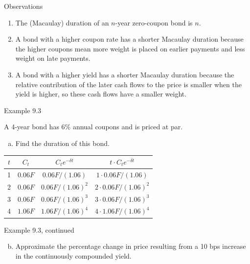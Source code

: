 \documentclass{beamer}
\begin{document}
\begin{frame}{Observations}

\begin{enumerate}
\item The (Macaulay) duration of an $n$-year zero-coupon bond is $n$.
\medskip
\item A bond with a higher coupon rate has a shorter Macaulay duration because the higher coupons mean more weight is placed on earlier payments and less weight on late payments.
\medskip
\item A bond with a higher yield has a shorter Macaulay duration because the relative contribution of the later cash flows to the price is smaller when the yield is higher, so these cash flows have a smaller weight.
\end{enumerate}

\end{frame}

\begin{frame}{Example 9.3}

A 4-year bond has 6\% annual coupons and is priced at par.
\begin{enumerate}[a)]
\item Find the duration of this bond.
\end{enumerate}

\begin{center}
\renewcommand{\arraystretch}{1.3}
\begin{tabular}{cccc}
\toprule
$t$ & $C_t$ & $C_t e^{-\delta t}$ & $t \cdot C_t e^{-\delta t}$ \\
\midrule
1 & $0.06F$ & $0.06F/(1.06)$ & $1 \cdot 0.06F/(1.06)$ \\
2 & $0.06F$ & $0.06F/(1.06)^2$ & $2 \cdot 0.06F/(1.06)^2$ \\
3 & $0.06F$ & $0.06F/(1.06)^3$ & $3 \cdot 0.06F/(1.06)^3$ \\
4 & $1.06F$ & $1.06F/(1.06)^4$ & $4 \cdot 1.06F/(1.06)^4$ \\
\bottomrule
\end{tabular}
\end{center}

\vfill
\end{frame}

\begin{frame}{Example 9.3, continued}

\begin{enumerate}[a)]
\setcounter{enumi}{1}
\item Approximate the percentage change in price resulting from a 10 bps increase in the continuously compounded yield.
\end{enumerate}

\vfill
\end{frame}
\end{document}
